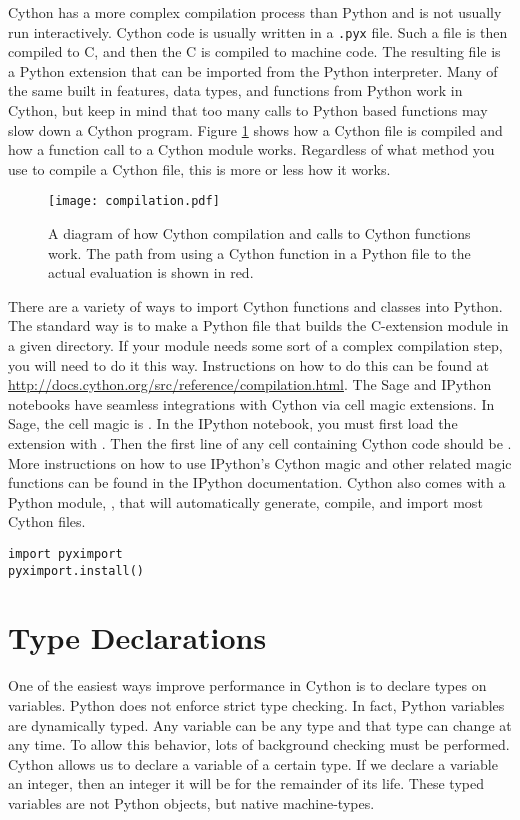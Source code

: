 Cython has a more complex compilation process than Python and is not usually run interactively.
Cython code is usually written in a \texttt{.pyx} file.
Such a file is then compiled to C, and then the C is compiled to machine code.
The resulting file is a Python extension that can be imported from the Python interpreter.
Many of the same built in features, data types, and functions from Python work in Cython, but keep in mind that too many calls to Python based functions may slow down a Cython program.
Figure \ref{cython:compilation} shows how a Cython file is compiled and how a function call to a Cython module works.
Regardless of what method you use to compile a Cython file, this is more or less how it works.

\begin{figure}
\centering
\texttt{[image: compilation.pdf]}
\caption{A diagram of how Cython compilation and calls to Cython functions work.
The path from using a Cython function in a Python file to the actual evaluation is shown in red.}
\label{cython:compilation}
\end{figure}

There are a variety of ways to import Cython functions and classes into Python.
The standard way is to make a Python file that builds the C-extension module in a given directory.
If your module needs some sort of a complex compilation step, you will need to do it this way.
Instructions on how to do this can be found at \url{http://docs.cython.org/src/reference/compilation.html}.
The Sage and IPython notebooks have seamless integrations with Cython via cell magic extensions.
In Sage, the cell magic is .
In the IPython notebook, you must first load the extension with .
Then the first line of any cell containing Cython code should be .
More instructions on how to use IPython's Cython magic and other related magic functions can be found in the IPython documentation.
Cython also comes with a Python module, , that will automatically generate, compile, and import most Cython files.
\begin{lstlisting}
import pyximport
pyximport.install()
\end{lstlisting}

\section*{Type Declarations}
One of the easiest ways improve performance in Cython is to declare types on variables.
Python does not enforce strict type checking.  In fact, Python variables are dynamically typed.
Any variable can be any type and that type can change at any time.
To allow this behavior, lots of background checking must be performed.
Cython allows us to declare a variable of a certain type.  If we declare a variable an integer, then an integer it will be for the remainder of its life.
These typed variables are not Python objects, but native machine-types.

